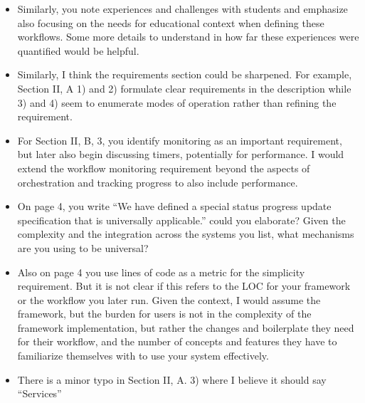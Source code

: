 \begin{itemize}
\item \OK Similarly, you note experiences and challenges with students and emphasize also focusing on the needs for educational context when defining these workflows. Some more details to understand in how far these experiences were quantified would be helpful.


\item \OK Similarly, I think the requirements section could be sharpened. For example, Section II, A 1) and 2) formulate clear requirements in the description while 3) and 4) seem to enumerate modes of operation rather than refining the requirement.


\item \OK For Section II, B, 3, you identify monitoring as an important requirement, but later also begin discussing timers, potentially for performance. I would extend the workflow monitoring requirement beyond the aspects of orchestration and tracking progress to also include performance.


\item \OK On page 4, you write “We have defined a special status progress update specification that is universally applicable.” could you elaborate? Given the complexity and the integration across the systems you list, what mechanisms are you using to be universal?


\item \OK Also on page 4 you use lines of code as a metric for the simplicity requirement. But it is not clear if this refers to the LOC for your framework or the workflow you later run. Given the context, I would assume the framework, but the burden for users is not in the complexity of the framework implementation, but rather the changes and boilerplate they need for their workflow, and the number of concepts and features they have to familiarize themselves with to use your system effectively.


\item \OK \DONE{} There is a minor typo in Section II, A. 3) where I believe it should say “Services”

\end{itemize}

